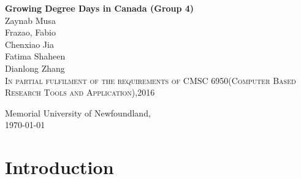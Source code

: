 \documentclass[12pt]{article}
\begin{document}
\begin{titlepage}
	\begin{center}
	
	
	{\Large \bf
Growing Degree Days in Canada (Group 4) \\

\vspace*{0.4in}
}
Zaynab Musa\\ 
Frazao, Fabio\\
Chenxiao Jia\\
Fatima Shaheen\\
Dianlong Zhang\\

\vspace*{0.4in}  
\textsc{\small In partial fulfilment of the requirements of CMSC 6950(Computer Based Research Tools and Application),2016}

\end{center}
\vspace*{5.0in}
\begin{flushleft}
{\textsc Memorial University of Newfoundland,} \\
\today
\end{flushleft}
\end{titlepage}

\newpage
\begin{abstract}
Growing Degree Days (GDDs) are used to estimate the growth and development of plants and insects during the growing season. Heat units expressed in growing degree days(GDDs) are frequently used to describe the timing of biological process

The objective of this paper is to calculate the GDD for selected cities in Canada. We  also provide a visual representation of the accumulated GDD for selected cities in Canada over a given period.A visual examination of the annual cycle of minimum and maximum daily temperatures for canadian cities is explored.


 Finally, we explore how the GDD calculation depends on the base temperature for selected cities in Canada.\\



 Keywords -- {\bf Growing Degree Days(GDDs)}


\end{abstract}
\newpage
\tableofcontents
\newpage
\section{ \bf Introduction}
\end{document}
